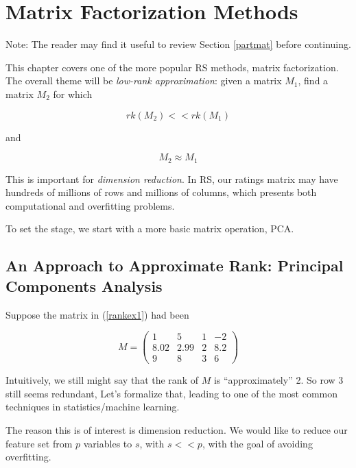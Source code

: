 
\chapter{Matrix Factorization Methods}  

Note:  The reader may find it useful to review Section \ref{partmat}
before continuing.

This chapter covers one of the more popular RS methods, matrix
factorization.  The overall theme will be \textit{low-rank
approximation}:  given a matrix $M_1$,  find a matrix $M_2$ for which 

\begin{equation}
rk(M_2) << rk(M_1)
\end{equation}

and 

\begin{equation}
M_2 \approx M_1
\end{equation}

This is important for \textit{dimension reduction}.  In RS, our
ratings matrix may have hundreds of millions of rows and millions of
columns, which presents both computational and overfitting problems.

To set the stage, we start with a more basic matrix operation, PCA.

\section{An Approach to Approximate Rank:  Principal Components
Analysis}

Suppose the matrix in (\ref{rankex1}) had been

\begin{equation}
\label{rankex2}  
M =
\left (
\begin{array}{rrrr}
1 & 5 & 1 & -2\\
8.02 & 2.99 & 2 & 8.2\\
9 & 8 & 3 & 6 
\end{array}
\right )
\end{equation}

Intuitively, we still might say that the rank of $M$ is
``approximately'' 2.  So row 3 still seems redundant, Let's
formalize that, leading to one of the most common techniques in
statistics/machine learning.  

The reason this is of interest is dimension reduction.  We would like to
reduce our feature set from $p$ variables to $s$, with $s << p$, with
the goal of avoiding overfitting.

